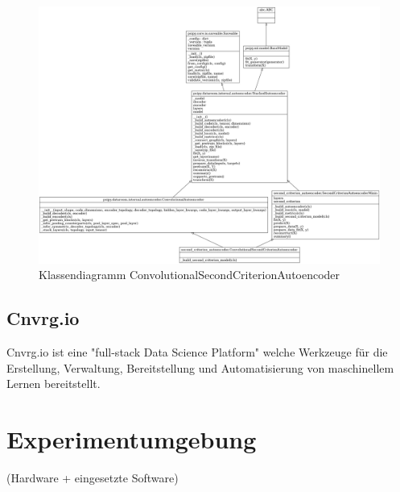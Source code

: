 		
			\begin{figure}[h]
			\centering
			\includegraphics[width=\textwidth, center]{bilder/Grundlagen/Klassen_CSCA.png}
			\caption[Klassendiagramm ConvolutionalSecondCriterionAutoencoder]{Klassendiagramm ConvolutionalSecondCriterionAutoencoder}
			\label{img:ConvolutionalSecondCriterionAutoencoder}
		\end{figure}
		
		
		\subsection{Cnvrg.io}
		\label{subsec:Cnvrg.io}
		Cnvrg.io   ist eine "full-stack Data Science Platform" welche Werkzeuge  für die Erstellung, Verwaltung, Bereitstellung  und Automatisierung von maschinellem Lernen bereitstellt. 
			
	\section{Experimentumgebung}
	\label{sec:Experimentumgebung}
		(Hardware + eingesetzte Software)